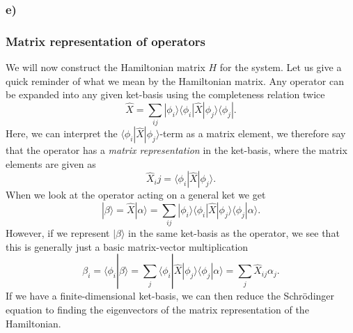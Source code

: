 \documentclass[a4paper, 11pt, notitlepage, english]{article}
\newcommand{\bra}[1]{\langle #1|}
\newcommand{\ket}[1]{|#1 \rangle}
\newcommand{\braket}[2]{\langle #1 | #2 \rangle}
\newcommand{\op}[1]{\hat{#1}}
\newcommand{\braopket}[3]{\langle #1 | {#2} | #3 \rangle}
\begin{document}
\clearpage

\subsubsection*{e)}
\subsubsection*{Matrix representation of operators}
We will now construct the Hamiltonian matrix $H$ for the system. Let us give a quick reminder of what we mean by the Hamiltonian matrix. Any operator can be expanded into any given ket-basis using the completeness relation twice
$$\op{X} = \sum_{ij}\ket{\phi_i}\braopket{\phi_i}{\op{X}}{\phi_j}\bra{\phi_j}.$$
Here, we can interpret the $\braopket{\phi_i}{\op{X}}{\phi_j}$-term as a matrix element, we therefore say that the operator has a \emph{matrix representation} in the ket-basis, where the matrix elements are given as
$$\op{X}_ij = \braopket{\phi_i}{\op{X}}{\phi_j}.$$
When we look at the operator acting on a general ket we get
$$\ket{\beta} = \op{X}\ket{\alpha} = \sum_{ij}\ket{\phi_i}\braopket{\phi_i}{\op{X}}{\phi_j}\braket{\phi_j}{\alpha}.$$
However, if we represent $\ket{\beta}$ in the same ket-basis as the operator, we see that this is generally just a basic matrix-vector multiplication
$$\beta_i = \braket{\phi_i}{\beta} = \sum_j \braopket{\phi_i}{\op{X}}{\phi_j}\braket{\phi_j}{\alpha} = \sum_j \op{X}_{ij}\alpha_j.$$
If we have a finite-dimensional ket-basis, we can then reduce the Schrödinger equation to finding the eigenvectors of the matrix representation of the Hamiltonian.
\end{document}
